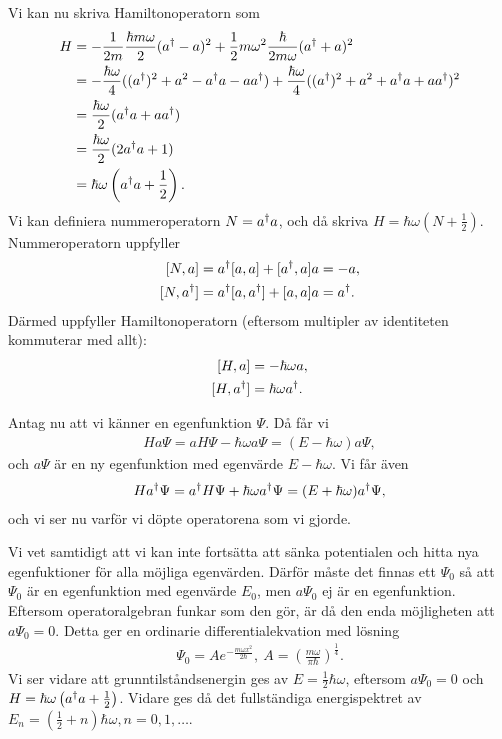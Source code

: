Vi kan nu skriva Hamiltonoperatorn som
\begin{align*}
	H &= -\frac{1}{2m}\frac{\hbar m\omega}{2}(a^{\dagger} - a)^{2} + \frac{1}{2}m\omega^{2}\frac{\hbar}{2m\omega}(a^{\dagger} + a)^{2} \\
	  &= -\frac{\hbar\omega}{4}((a^{\dagger})^{2} + a^{2} - a^{\dagger}a - aa^{\dagger}) + \frac{\hbar\omega}{4}((a^{\dagger})^{2} + a^{2} + a^{\dagger}a + aa^{\dagger})^{2} \\
	  &= \frac{\hbar\omega}{2}(a^{\dagger}a + aa^{\dagger}) \\
	  &= \frac{\hbar\omega}{2}(2a^{\dagger}a + 1) \\
	  &= \hbar\omega\left(a^{\dagger}a + \frac{1}{2}\right).
\end{align*}
Vi kan definiera nummeroperatorn $N = a^{\dagger}a$, och då skriva $H = \hbar\omega\left(N + \frac{1}{2}\right)$. Nummeroperatorn uppfyller 
\begin{align*}
	\commut{N}{a}       &= \adj{a}\commut{a}{a} + \commut{\adj{a}}{a}a = -a, \\
	\commut{N}{\adj{a}} &= \adj{a}\commut{a}{\adj{a}} + \commut{a}{a}a = \adj{a}.
\end{align*}
Därmed uppfyller Hamiltonoperatorn (eftersom multipler av identiteten kommuterar med allt):
\begin{align*}
	\commut{H}{a}       &= -\hbar\omega a, \\
	\commut{H}{\adj{a}} &= \hbar\omega\adj{a}.
\end{align*}

Antag nu att vi känner en egenfunktion $\Psi$. Då får vi
\begin{align*}
	Ha\Psi = aH\Psi - \hbar\omega a\Psi = (E - \hbar\omega)a\Psi,
\end{align*}
och $a\Psi$ är en ny egenfunktion med egenvärde $E - \hbar\omega$. Vi får även
\begin{align*}
	Ha^{\dagger}\Psi = a^{\dagger}H\Psi + \hbar\omega a^{\dagger}\Psi = (E + \hbar\omega)a^{\dagger}\Psi,
\end{align*}
och vi ser nu varför vi döpte operatorena som vi gjorde.

Vi vet samtidigt att vi kan inte fortsätta att sänka potentialen och hitta nya egenfuktioner för alla möjliga egenvärden. Därför måste det finnas ett $\Psi_{0}$ så att $\Psi_{0}$ är en egenfunktion med egenvärde $E_{0}$, men $a\Psi_{0}$ ej är en egenfunktion. Eftersom operatoralgebran funkar som den gör, är då den enda möjligheten att $a\Psi_{0} = 0$. Detta ger en ordinarie differentialekvation med lösning
\begin{align*}
	\Psi_{0} = Ae^{-\frac{m\omega x^{2}}{2\hbar}},\ A = \left(\frac{m\omega}{\pi\hbar}\right)^{\frac{1}{4}}.
\end{align*}
Vi ser vidare att grunntilståndsenergin ges av $E = \frac{1}{2}\hbar\omega$, eftersom $a\Psi_{0} = 0$ och $H = \hbar\omega\left(a^{\dagger}a + \frac{1}{2}\right)$. Vidare ges då det fullständiga energispektret av $E_{n} = \left(\frac{1}{2} + n\right)\hbar\omega, n = 0, 1, \dots$.


